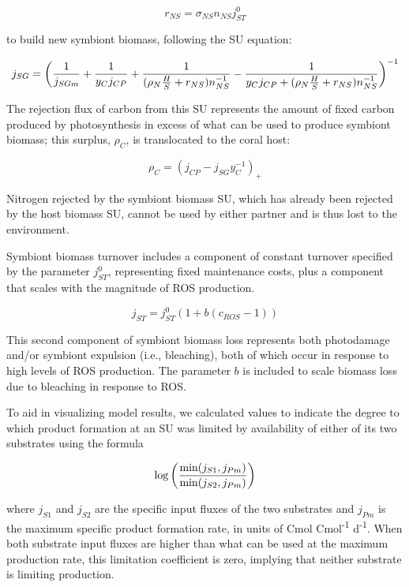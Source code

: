 \documentclass[]{elsarticle} %
\begin{document}
\begin{equation} r_{NS}=\sigma_{NS}n_{NS}j_{ST}^0 \end{equation}

to build new symbiont biomass, following the SU equation:

\begin{equation} j_{SG} = \bigg({1 \over j_{SGm}} + {1 \over y_{C}j_{CP}} + {1 \over {(\rho_N{H \over S} + r_{NS})n_{NS}^{-1}}} - {1 \over {y_{C}j_{CP} + (\rho_N{H \over S} + r_{NS})n_{NS}^{-1}}}\bigg)^{-1} \end{equation}

The rejection flux of carbon from this SU represents the amount of fixed
carbon produced by photosynthesis in excess of what can be used to
produce symbiont biomass; this surplus, \(\rho_C\), is translocated to
the coral host:

\begin{equation} \rho_C = (j_{CP} - j_{SG}y_{C}^{-1})_+ \end{equation}

Nitrogen rejected by the symbiont biomass SU, which has already been
rejected by the host biomass SU, cannot be used by either partner and is
thus lost to the environment.

Symbiont biomass turnover includes a component of constant turnover
specified by the parameter \(j_{ST}^0\), representing fixed maintenance
costs, plus a component that scales with the magnitude of ROS
production.

\begin{equation} j_{ST} = j_{ST}^0(1 + b(c_{ROS}-1)) \end{equation}

This second component of symbiont biomass loss represents both
photodamage and/or symbiont expulsion (i.e., bleaching), both of which
occur in response to high levels of ROS production. The parameter \(b\)
is included to scale biomass loss due to bleaching in response to ROS.

To aid in visualizing model results, we calculated values to indicate
the degree to which product formation at an SU was limited by
availability of either of its two substrates using the formula

\begin{equation} \log \bigg({{\min(j_{S1}, j_{Pm})} \over {\min(j_{S2}, j_{Pm})}}\bigg) \end{equation}

where \(j_{S1}\) and \(j_{S2}\) are the specific input fluxes of the two
substrates and \(j_{Pm}\) is the maximum specific product formation
rate, in units of Cmol Cmol\textsuperscript{-1} d\textsuperscript{-1}.
When both substrate input fluxes are higher than what can be used at the
maximum production rate, this limitation coefficient is zero, implying
that neither substrate is limiting production.
\end{document}
